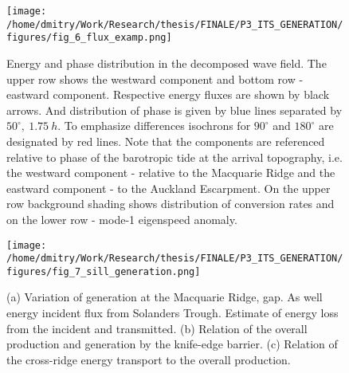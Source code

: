 \documentclass[12pt]{article}
\begin{document}
\begin{figure}
	\centering
	\texttt{[image: /home/dmitry/Work/Research/thesis/FINALE/P3\_ITS\_GENERATION/figures/fig\_6\_flux\_examp.png]}
	\caption{Energy and phase distribution in the decomposed wave field. The upper row shows the 
	westward component and bottom row - eastward component. Respective energy fluxes are shown by 
	black arrows. And distribution of phase is given by blue lines separated by 
	$50^{\circ},~1.75~h$. To emphasize differences isochrons for $90^{\circ}$ and $180^{\circ}$ are 
	designated by red lines. Note that the components are referenced relative to phase of the 
	barotropic tide at the arrival topography, i.e. the westward component  - relative to the 
	Macquarie Ridge and the eastward component - to the Auckland Escarpment. On the upper row 
	background shading shows distribution of conversion rates and on the lower row - mode-1 
	eigenspeed anomaly.}
	\label{C3.fig:wv_fld_dist}
\end{figure}

\begin{figure}
	\centering
	\texttt{[image: /home/dmitry/Work/Research/thesis/FINALE/P3\_ITS\_GENERATION/figures/fig\_7\_sill\_generation.png]}
	\caption{(a) Variation of generation at the Macquarie Ridge, gap. As well energy incident flux 
	from Solanders Trough. Estimate of energy loss from the incident and transmitted. (b) Relation 
	of the overall production and generation by the knife-edge barrier. (c) Relation of the 
	cross-ridge energy transport to the overall production.}
	\label{C3.fig:gen_sill}
\end{figure}

%

\end{document}
